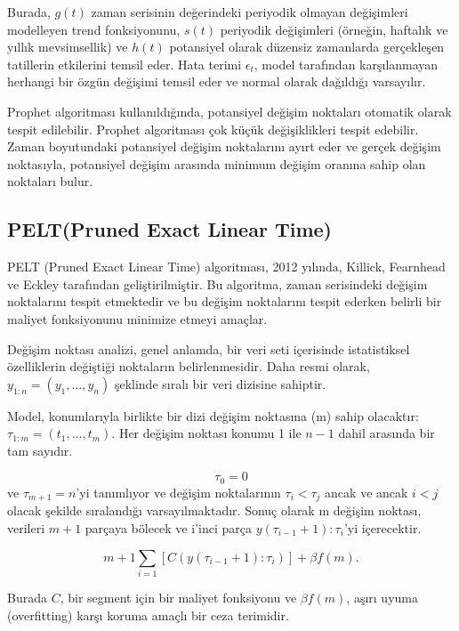 \documentclass[12pt,twoside]{deuthesis}
\begin{document}
Burada, \(g(t)\) zaman serisinin değerindeki periyodik olmayan değişimleri modelleyen trend fonksiyonunu, \(s(t)\) periyodik değişimleri (örneğin, haftalık ve yıllık mevsimsellik) ve \(h(t)\) potansiyel olarak düzensiz zamanlarda gerçekleşen tatillerin etkilerini temsil eder. Hata terimi \(\epsilon_t\), model tarafından karşılanmayan herhangi bir özgün değişimi temsil eder ve normal olarak dağıldığı varsayılır.

Prophet algoritması kullanıldığında, potansiyel değişim noktaları otomatik olarak tespit edilebilir. Prophet algoritması çok küçük değişiklikleri tespit edebilir. Zaman boyutundaki potansiyel değişim noktalarını ayırt eder ve gerçek değişim noktasıyla, potansiyel değişim arasında minimum değişim oranına sahip olan noktaları bulur.

\hypertarget{peltpruned-exact-linear-time}{%
\subsection{PELT(Pruned Exact Linear Time)}\label{peltpruned-exact-linear-time}}

PELT (Pruned Exact Linear Time) algoritması, 2012 yılında, Killick, Fearnhead ve Eckley tarafından geliştirilmiştir. Bu algoritma, zaman serisindeki değişim noktalarını tespit etmektedir ve bu değişim noktalarını tespit ederken belirli bir maliyet fonksiyonunu minimize etmeyi amaçlar.

Değişim noktası analizi, genel anlamda, bir veri seti içerisinde istatistiksel özelliklerin değiştiği noktaların belirlenmesidir. Daha resmi olarak, \(y_{1:n} = (y_1, \ldots, y_n)\) şeklinde sıralı bir veri dizisine sahiptir.

Model, konumlarıyla birlikte bir dizi değişim noktasına (m) sahip olacaktır: \(\tau_{1:m} = (t_1, \ldots, t_m)\). Her değişim noktası konumu 1 ile \(n - 1\) dahil arasında bir tam sayıdır.

\[ \tau_0 = 0 \] ve \(\tau_{m+1} = n\)'yi tanımlıyor ve değişim noktalarının \(\tau_i < \tau_j\) ancak ve ancak \(i < j\) olacak şekilde sıralandığı varsayılmaktadır. Sonuç olarak m değişim noktası, verileri \(m + 1\) parçaya bölecek ve i'inci parça \(y(\tau_{i-1}+1):\tau_i\)'yi içerecektir.

\[ m+1 \sum_{i=1} [C(y(\tau_{i-1}+1):\tau_i)] + \beta f (m). \]

Burada \(C\), bir segment için bir maliyet fonksiyonu ve \(\beta f(m)\), aşırı uyuma (overfitting) karşı koruma amaçlı bir ceza terimidir.
\end{document}
